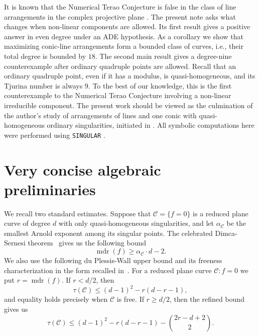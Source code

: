 \documentclass[11pt]{article}
\theoremstyle{remark}
\newcommand{\mdr}{\operatorname{mdr}}
\begin{document}
It is known that the Numerical Terao Conjecture is false in the class of line arrangements in the complex projective plane \cite{Mar}. The present note asks what changes when non-linear components are allowed. Its first result gives a positive answer in even degree under an ADE hypothesis. As a corollary we show that maximizing conic-line arrangements form a bounded class of curves, i.e., their total degree is bounded by $18$. The second main result gives a degree-nine counterexample after ordinary quadruple points are allowed. Recall that an ordinary quadruple point, even if it has a modulus, is quasi-homogeneous, and its Tjurina number is always $9$. To the best of our knowledge, this is the first counterexample to the Numerical Terao Conjecture involving a non-linear irreducible component. The present work should be viewed as the culmination of the author’s study of arrangements of lines and one conic with quasi-homogeneous ordinary singularities, initiated in \cite{PokoraOneConic}. All symbolic computations here were performed using \texttt{SINGULAR} \cite{Singular}.

\section{Very concise algebraic preliminaries}

We recall two standard estimates.  Suppose that $ \mathcal{C} = \{f=0\}$ is a reduced plane curve of degree $d$ with only quasi-homogeneous singularities, and let $\alpha_{\mathcal{C}}$ be the smallest Arnold exponent among its singular points. The celebrated Dimca-Sernesi theorem~\cite{DimcaSernesi} gives us the following bound
\begin{equation}\label{eq:DS}
 \mdr(f)\ge \alpha_{\mathcal{C}} \cdot d-2.
\end{equation}
We also use the following du Plessis-Wall upper bound \cite{DPP1} and its freeness characterization in the form recalled in~\cite{DimcaMaxTau,DimcaSticlaru}.
For a reduced plane curve $\mathcal{C} : f=0$ we put $r=\mdr(f)$.  If $r<d/2$, then
\begin{equation}\label{eq:DPW-small}
 \tau(\mathcal{C})\le (d-1)^2-r(d-r-1),
\end{equation}
and equality holds precisely when $\mathcal{C}$ is free.  If $r\ge d/2$, then the
refined bound gives us
\begin{equation}\label{eq:DPW-large}
 \tau(\mathcal{C})\le (d-1)^2-r(d-r-1) -\binom{2r-d+2}{2}.
\end{equation}
\end{document}
